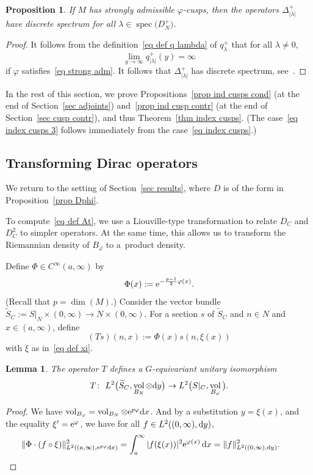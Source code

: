 \documentclass[10pt,a4paper]{amsart}
\numberwithin{equation}{section}
\newtheorem{Lemma}[Theorem]{Lemma}
\newtheorem{Proposition}[Theorem]{Proposition}
 { \theoremstyle{definition}
\newtheorem{Definition}[Theorem]{Definition}
\newtheorem{Note}[Theorem]{Note}
\newtheorem{Example}[Theorem]{Example}
\newtheorem{Remark}[Theorem]{Remark} }
\DeclareMathOperator{\spec}{spec}
\DeclareMathOperator{\vol}{vol}
\begin{document}
\begin{Proposition}\label{prop discrete spec}
If $M$ has strongly admissible $\varphi$-cusps, then the operators $\Delta_{|\lambda|}^{+}$ have discrete spectrum for all $\lambda \in \spec\big(D_N^+\big)$.
\end{Proposition}
\begin{proof}
It follows from the definition~\eqref{eq def q lambda} of $q_{\lambda}^{+}$ that for all $\lambda \not=0$,
\[
\lim_{y \to \infty}q_{|\lambda|}^{+}(y) = \infty
\]
if $\varphi$ satisfies~\eqref{eq strong adm}. It follows that $\Delta_{|\lambda|}^{+}$ has discrete spectrum, see~\cite[Theorem~1.3.1, Lemma~3.1.1 and equation~(1.3)]{Levitan91}.
\end{proof}

In the rest of this section, we prove Propositions~\ref{prop ind cusps cond} (at the end of Section~\ref{sec adjoints}) and~\ref{prop ind cusp contr} (at the end of Section~\ref{sec cusp contr}), and thus Theorem~\ref{thm index cusps}. (The case~\eqref{eq index cusps 3} follows immediately from the case~\eqref{eq index cusps}.)

\subsection{Transforming Dirac operators}

We return to the setting of Section~\ref{sec results}, where $D$ is of the form in Proposition~\ref{prop Dphi}.

To compute~\eqref{eq def At}, we use a Liouville-type transformation to relate $D_C$ and $D_C^2$ to simpler operators. At the same time, this allows us to transform the Riemannian density of $B_{\varphi}$ to a~product density.

Define $\Phi \in C^{\infty}(a, \infty)$ by
\begin{equation} \label{eq def Phi}
\Phi(x) := {\rm e}^{-\frac{p-1}{2}\varphi(x)}.
\end{equation}
(Recall that $p = \dim(M)$.)
Consider the vector bundle $\widetilde{S}_C := S|_N \times (0,\infty) \to N \times (0, \infty)$. For a section $s$ of $\widetilde{S}_C$ and $n \in N$ and $x \in (a,\infty)$, define
\[
(Ts)(n,x) := \Phi(x) s(n, \xi(x))
\]
with $\xi$ as in~\eqref{eq def xi}.
\begin{Lemma}\label{lem T isom}
The operator $T$ defines a $G$-equivariant unitary isomorphism
\[
T\colon \ L^2\big(\widetilde{S}_C, \vol_{B_N} \otimes {\rm d}y\big) \to L^2\big(S|_C, \vol_{B_{\varphi}}\big).
\]
\end{Lemma}
\begin{proof}
We have
$\vol_{B_{\varphi}} = \vol_{B_N} \otimes {\rm e}^{p\varphi} {\rm d}x$.
And by a substitution $y = \xi(x)$, and the equality $\xi' = {\rm e}^{\varphi}$, we have for all $f \in L^2( (0,\infty), {\rm d}y)$,
\begin{equation*}
\|\Phi \cdot (f \circ \xi)\|^2_{L^2( (a,\infty), {\rm e}^{p\varphi} {\rm d}x)} =
 \int_{a}^{\infty} |f(\xi(x))|^2 {\rm e}^{\varphi(x)}\, {\rm d}x = \|f\|^2_{L^2( (0,\infty), {\rm d}y)}.\tag*{\qed}
\end{equation*}
\renewcommand{\qed}{}
\end{proof}
\end{document}
